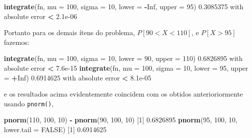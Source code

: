 \documentclass[10pt,a4paper]{book}
\newenvironment{Shaded}{\begin{snugshade}}{\end{snugshade}}
\newcommand{\KeywordTok}[1]{\textcolor[rgb]{0.13,0.29,0.53}{\textbf{#1}}}
\newcommand{\DataTypeTok}[1]{\textcolor[rgb]{0.13,0.29,0.53}{#1}}
\newcommand{\DecValTok}[1]{\textcolor[rgb]{0.00,0.00,0.81}{#1}}
\newcommand{\FloatTok}[1]{\textcolor[rgb]{0.00,0.00,0.81}{#1}}
\newcommand{\StringTok}[1]{\textcolor[rgb]{0.31,0.60,0.02}{#1}}
\newcommand{\OtherTok}[1]{\textcolor[rgb]{0.56,0.35,0.01}{#1}}
\newcommand{\OperatorTok}[1]{\textcolor[rgb]{0.81,0.36,0.00}{\textbf{#1}}}
\newcommand{\NormalTok}[1]{#1}
\begin{document}
\begin{Shaded}
\begin{Highlighting}[]
\KeywordTok{integrate}\NormalTok{(fn, }\DataTypeTok{mu =} \DecValTok{100}\NormalTok{, }\DataTypeTok{sigma =} \DecValTok{10}\NormalTok{, }\DataTypeTok{lower =} \OperatorTok{-}\OtherTok{Inf}\NormalTok{, }\DataTypeTok{upper =} \DecValTok{95}\NormalTok{)}
\FloatTok{0.3085375}\NormalTok{ with absolute error }\OperatorTok{<}\StringTok{ }\FloatTok{2.1e-06}
\end{Highlighting}
\end{Shaded}

Portanto para os demais ítens do problema, \(P[90 < X < 110]\), e
\(P[X > 95]\) fazemos:

\begin{Shaded}
\begin{Highlighting}[]
\KeywordTok{integrate}\NormalTok{(fn, }\DataTypeTok{mu =} \DecValTok{100}\NormalTok{, }\DataTypeTok{sigma =} \DecValTok{10}\NormalTok{, }\DataTypeTok{lower =} \DecValTok{90}\NormalTok{, }\DataTypeTok{upper =} \DecValTok{110}\NormalTok{)}
\FloatTok{0.6826895}\NormalTok{ with absolute error }\OperatorTok{<}\StringTok{ }\FloatTok{7.6e-15}
\KeywordTok{integrate}\NormalTok{(fn, }\DataTypeTok{mu =} \DecValTok{100}\NormalTok{, }\DataTypeTok{sigma =} \DecValTok{10}\NormalTok{, }\DataTypeTok{lower =} \DecValTok{95}\NormalTok{, }\DataTypeTok{upper =} \OperatorTok{+}\OtherTok{Inf}\NormalTok{)}
\FloatTok{0.6914625}\NormalTok{ with absolute error }\OperatorTok{<}\StringTok{ }\FloatTok{8.1e-05}
\end{Highlighting}
\end{Shaded}

e os resultados acima evidentemente coincidem com os obtidos
anterioriormente usando \texttt{pnorm()},

\begin{Shaded}
\begin{Highlighting}[]
\KeywordTok{pnorm}\NormalTok{(}\DecValTok{110}\NormalTok{, }\DecValTok{100}\NormalTok{, }\DecValTok{10}\NormalTok{) }\OperatorTok{-}\StringTok{ }\KeywordTok{pnorm}\NormalTok{(}\DecValTok{90}\NormalTok{, }\DecValTok{100}\NormalTok{, }\DecValTok{10}\NormalTok{)}
\NormalTok{[}\DecValTok{1}\NormalTok{] }\FloatTok{0.6826895}
\KeywordTok{pnorm}\NormalTok{(}\DecValTok{95}\NormalTok{, }\DecValTok{100}\NormalTok{, }\DecValTok{10}\NormalTok{, }\DataTypeTok{lower.tail =} \OtherTok{FALSE}\NormalTok{)}
\NormalTok{[}\DecValTok{1}\NormalTok{] }\FloatTok{0.6914625}
\end{Highlighting}
\end{Shaded}
\end{document}
